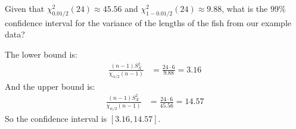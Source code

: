 
Given that $\chi^2_{0.01/2}(24) \approx 45.56$ and $\chi^2_{1-0.01/2}(24) \approx 9.88$,
what is the 99\% confidence interval for the variance of the lengths of the
fish from our example data?



The lower bound is:
\begin{align*}
\frac{(n-1)S^2_X}{\chi_{\alpha/2}(n-1)} &= \frac{24 \cdot 6}{9.88} = 3.16
\end{align*}
And the upper bound is:
\begin{align*}
\frac{(n-1)S^2_X}{\chi_{\alpha/2}(n-1)} &= \frac{24 \cdot 6}{45.56} = 14.57
\end{align*}
So the confidence interval is $[3.16, 14.57]$.

